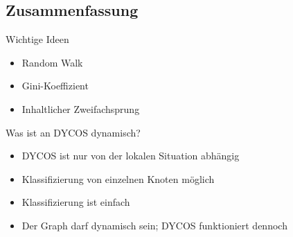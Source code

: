 \subsection{Zusammenfassung}
\begin{frame}{Wichtige Ideen}
    \begin{itemize}
        \item<1-> Random Walk
        \item<2-> Gini-Koeffizient
        \item<3-> Inhaltlicher Zweifachsprung
    \end{itemize}
\end{frame}

\begin{frame}{Was ist an DYCOS dynamisch?}
    \begin{itemize}
        \item<1-> DYCOS ist nur von der lokalen Situation abhängig
        \item<2-> Klassifizierung von einzelnen Knoten möglich
        \item<3-> Klassifizierung ist einfach
        \item<4->[$\Rightarrow$] Der Graph darf dynamisch sein; DYCOS funktioniert dennoch
    \end{itemize}
\end{frame}
